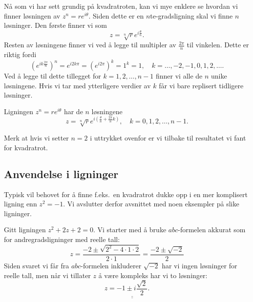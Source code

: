 \documentclass[a4paper,norsk,12pt]{article}
\newcommand{\ans}[1]{\underline{\underline{#1}}}
\newcounter{exa}
\begin{document}
Nå som vi har sett grundig på kvadratroten, kan vi mye enklere se hvordan vi finner løsningen av $z^n = re^{i\theta}$. Siden dette er en $n$te-gradsligning skal vi finne $n$ løsninger. Den første finner vi som
\begin{displaymath}
	z = \sqrt[n]{r}e^{i\frac{\theta}{n}}.
\end{displaymath}
Resten av løsningene finner vi ved å legge til multipler av $\frac{2\pi}{n}$ til vinkelen. Dette er riktig fordi
\begin{displaymath}
	\left(e^{ik\frac{2\pi}{n}}\right)^n = e^{i2k\pi} = (e^{i2\pi})^k = 1^k = 1, \quad k =  \ldots, -2, -1, 0, 1, 2, \ldots.
\end{displaymath}
Ved å legge til dette tillegget for $k=1, 2, \ldots, n-1$ finner vi alle de $n$ unike løsningene. Hvis vi tar med ytterligere verdier av $k$ får vi bare replisert tidligere løsninger.
\begin{tsummary}
	Ligningen $z^n = re^{i\theta}$ har de $n$ løsningene
	\begin{displaymath}
		z = \sqrt[n]{r}e^{i\left(\frac{\theta}{n} + \frac{2\pi}{n}k\right)}, \quad k=0,1,2,\ldots, n-1.
	\end{displaymath}
\end{tsummary}
\noindent
Merk at hvis vi setter $n=2$ i uttrykket ovenfor er vi tilbake til resultatet vi fant for kvadratrot.

\subsection{Anvendelse i ligninger}
Typisk vil behovet for å finne f.eks.~en kvadratrot dukke opp i en mer komplisert ligning enn $z^2=-1$. Vi avslutter derfor avsnittet med noen eksempler på slike ligninger.
\begin{texample}
Gitt ligningen $z^2 + 2z + 2 = 0$. Vi starter med å bruke $abc$-formelen akkurat som for andregradsligninger med reelle tall:
\begin{displaymath}
	z = \frac{-2\pm\sqrt{2^2-4\cdot1\cdot2}}{2\cdot 1}= \frac{-2\pm\sqrt{-2}}{2}
\end{displaymath}
Siden svaret vi får fra $abc$-formelen inkluderer $\sqrt{-2}$ har vi ingen løsninger for reelle tall, men når vi tillater $z$ å være kompleks har vi to løsninger:
\begin{displaymath}
	z= \ans{-1 \pm i\frac{\sqrt{2}}{2}}.
\end{displaymath}
\end{texample}
\end{document}
